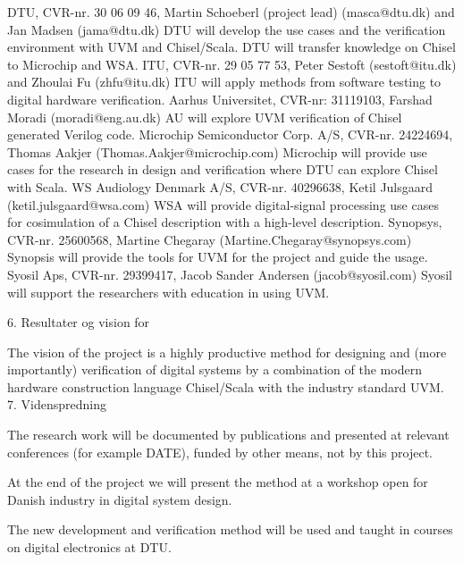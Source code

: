 \documentclass[fleqn,12pt]{article}
\begin{document}
DTU, CVR-nr. 30 06 09 46, Martin Schoeberl (project lead) (masca@dtu.dk) and Jan Madsen (jama@dtu.dk)
DTU will develop the use cases and the verification environment with UVM and Chisel/Scala. DTU will transfer knowledge on Chisel to Microchip and WSA.
ITU, CVR-nr. 29 05 77 53, Peter Sestoft (sestoft@itu.dk) and Zhoulai Fu (zhfu@itu.dk)
ITU will apply methods from software testing to digital hardware verification.
Aarhus Universitet, CVR-nr: 31119103, Farshad Moradi (moradi@eng.au.dk)
AU will explore UVM verification of Chisel generated Verilog code.
Microchip Semiconductor Corp. A/S, CVR-nr. 24224694, Thomas Aakjer (Thomas.Aakjer@microchip.com)
Microchip will provide use cases for the research in design and verification where DTU can explore Chisel with Scala.
WS Audiology Denmark A/S, CVR-nr. 40296638, Ketil Julsgaard (ketil.julsgaard@wsa.com)
WSA will provide digital-signal processing use cases for cosimulation of a Chisel description with a high-level description.
Synopsys, CVR-nr. 25600568, Martine Chegaray (Martine.Chegaray@synopsys.com)
Synopsis will provide the tools for UVM for the project and guide the usage.
Syosil Aps, CVR-nr. 29399417, Jacob Sander Andersen (jacob@syosil.com)
Syosil will support the researchers with education in using UVM.


6. Resultater og vision for 

The vision of the project is a highly productive method for designing and (more importantly) verification of digital systems by a combination of the modern hardware construction language Chisel/Scala with the industry standard UVM.
7. Videnspredning

The research work will be documented by publications and presented at relevant conferences (for example DATE), funded by other means, not by this project.

At the end of the project we will present the method at a workshop open for Danish industry in digital system design.

The new development and verification method will be used and taught in courses on digital electronics at DTU.
\end{document}
